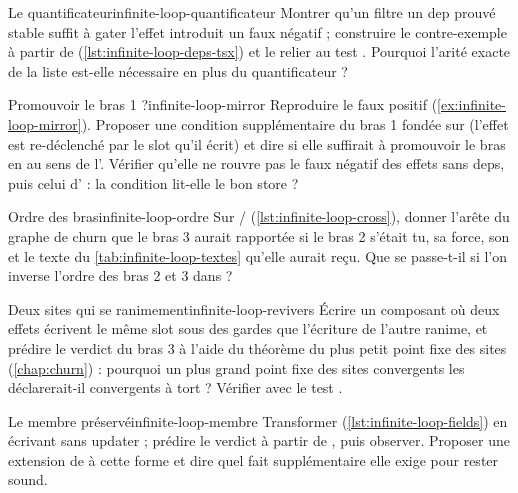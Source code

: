 \begin{exercice}{Le quantificateur}{infinite-loop-quantificateur}
Montrer qu'un filtre \og un dep prouvé stable suffit à gater l'effet\fg{} introduit un faux négatif ; construire le contre-exemple à partir de  (\cref{lst:infinite-loop-deps-tsx}) et le relier au test . Pourquoi l'arité exacte de la liste est-elle nécessaire en plus du quantificateur ?
\end{exercice}

\begin{exercice}{Promouvoir le bras 1 ?}{infinite-loop-mirror}
Reproduire le faux positif  (\cref{ex:infinite-loop-mirror}). Proposer une condition supplémentaire du bras 1 fondée sur  (\og l'effet est re-déclenché par le slot qu'il écrit\fg) et dire si elle suffirait à promouvoir le bras en \Error{} au sens de l'. Vérifier qu'elle ne rouvre pas le faux négatif des effets sans deps, puis celui d' : la condition lit-elle le bon store ?
\end{exercice}

\begin{exercice}{Ordre des bras}{infinite-loop-ordre}
Sur / (\cref{lst:infinite-loop-cross}), donner l'arête du graphe de churn que le bras 3 aurait rapportée si le bras 2 s'était tu, sa force, son  et le texte du \cref{tab:infinite-loop-textes} qu'elle aurait reçu. Que se passe-t-il si l'on inverse l'ordre des bras 2 et 3 dans  ?
\end{exercice}

\begin{exercice}{Deux sites qui se ranimement}{infinite-loop-revivers}
Écrire un composant où deux effets écrivent le même slot sous des gardes que l'écriture de l'autre ranime, et prédire le verdict du bras 3 à l'aide du théorème du plus petit point fixe des sites (\cref{chap:churn}) : pourquoi un plus grand point fixe des sites convergents les déclarerait-il convergents à tort ? Vérifier avec le test .
\end{exercice}

\begin{exercice}{Le membre préservé}{infinite-loop-membre}
Transformer  (\cref{lst:infinite-loop-fields}) en écrivant  sans updater ; prédire le verdict à partir de , puis observer. Proposer une extension de  à cette forme et dire quel fait supplémentaire elle exige pour rester sound.
\end{exercice}

